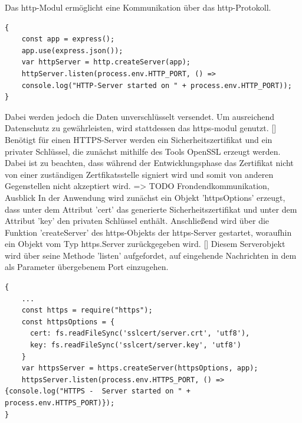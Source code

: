 Das http-Modul ermöglicht eine Kommunikation über das http-Protokoll. 
\begin{lstlisting}[caption=Einfache Verbindung, label=lst:nodejs_easyconnection]
 {
 	const app = express();
	app.use(express.json()); 
 	var httpServer = http.createServer(app);
 	httpServer.listen(process.env.HTTP_PORT, () => 
 	console.log("HTTP-Server started on " + process.env.HTTP_PORT));
}
\end{lstlisting}

Dabei werden jedoch die Daten unverschlüsselt versendet. Um ausreichend Datenschutz zu gewährleisten, wird stattdessen das https-modul genutzt. []%
\newline
Benötigt für einen HTTPS-Server werden ein Sicherheitszertifikat und ein privater Schlüssel, die zunächst mithilfe des Tools OpenSSL erzeugt werden.  
Dabei ist zu beachten, dass während der Entwicklungsphase das Zertifikat nicht von einer zuständigen Zertfikatsstelle signiert wird und somit von anderen Gegenstellen nicht akzeptiert wird. => TODO Frondendkommunikation, Ausblick
\newline
In der Anwendung wird zunächst ein Objekt 'httpsOptions' erzeugt, dass unter dem Attribut 'cert' das generierte Sicherheitszertifikat und unter dem Attribut 'key' den privaten Schlüssel enthält. Anschließend wird über die Funktion 'createServer' des https-Objekts der https-Server gestartet, woraufhin ein Objekt vom Typ https.Server zurückgegeben wird. []
Diesem Serverobjekt wird über seine Methode 'listen' aufgefordet, auf eingehende Nachrichten in dem als Parameter übergebenem Port einzugehen.

\begin{lstlisting}[caption=Gesicherte Verbindung, label=lst:nodejs_safeconnection]
 {
 	...
	const https = require("https");
	const httpsOptions = {
	  cert: fs.readFileSync('sslcert/server.crt', 'utf8'),
	  key: fs.readFileSync('sslcert/server.key', 'utf8')
	}
	var httpsServer = https.createServer(httpsOptions, app);
	httpsServer.listen(process.env.HTTPS_PORT, () => {console.log("HTTPS - 	Server started on " + process.env.HTTPS_PORT)});
}
\end{lstlisting}



